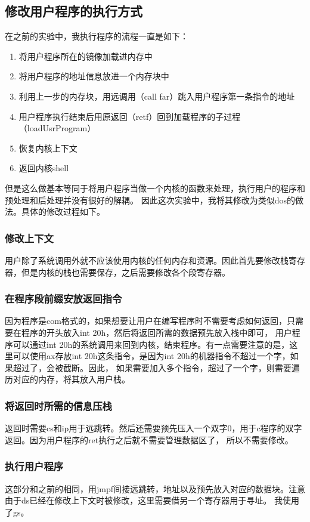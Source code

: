 \documentclass[a4paper, 11pt]{article} %
\begin{document}
\subsection{修改用户程序的执行方式}
在之前的实验中，我执行程序的流程一直是如下：
\begin{enumerate}
  \item 将用户程序所在的镜像加载进内存中
  \item 将用户程序的地址信息放进一个内存块中
  \item 利用上一步的内存块，用远调用（call far）跳入用户程序第一条指令的地址
  \item 用户程序执行结束后用原返回（retf）回到加载程序的子过程（loadUsrProgram）
  \item 恢复内核上下文
  \item 返回内核shell
\end{enumerate}
但是这么做基本等同于将用户程序当做一个内核的函数来处理，执行用户的程序和预处理和后处理并没有很好的解耦。
因此这次实验中，我将其修改为类似dos的做法。具体的修改过程如下。
\subsubsection{修改上下文}
用户除了系统调用外就不应该使用内核的任何内存和资源。因此首先要修改栈寄存器，但是内核的栈也需要保存，之后需要修改各个段寄存器。
\subsubsection{在程序段前缀安放返回指令}
因为程序是com格式的，如果想要让用户在编写程序时不需要考虑如何返回，只需要在程序的开头放入int 20h，然后将返回所需的数据预先放入栈中即可，
用户程序可以通过int 20h的系统调用来回到内核，结束程序。有一点需要注意的是，这里可以使用ax存放int 20h这条指令，是因为int 20h的机器指令不超过一个字，如果超过了，会被截断。因此，
如果需要加入多个指令，超过了一个字，则需要遍历对应的内存，将其放入用户栈。
\subsubsection{将返回时所需的信息压栈}
返回时需要cs和ip用于远跳转。然后还需要预先压入一个双字0，用于c程序的双字返回。因为用户程序的ret执行之后就不需要管理数据区了，
所以不需要修改。
\subsubsection{执行用户程序}
这部分和之前的相同，用jmpf间接远跳转，地址以及预先放入对应的数据块。注意由于ds已经在修改上下文时被修改，这里需要借另一个寄存器用于寻址。
我使用了gs。
\end{document}
